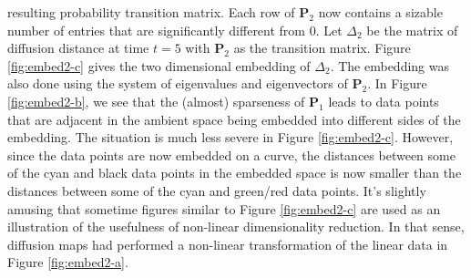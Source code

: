 resulting probability transition matrix. Each row of $\mathbf{P}_2$
now contains a sizable number of entries that are significantly
different from $0$. Let $\Delta_{2}$ be the matrix of diffusion
distance at time $t = 5$ with $\mathbf{P}_2$ as the transition
matrix. Figure \ref{fig:embed2-c} gives the two dimensional embedding
of $\Delta_{2}$. The embedding was also done using the system of
eigenvalues and eigenvectors of $\mathbf{P}_2$. In Figure
\ref{fig:embed2-b}, we see that the (almost) sparseness of
$\mathbf{P}_1$ leads to data points that are adjacent in the ambient
space being embedded into different sides of the embedding. The
situation is much less severe in Figure \ref{fig:embed2-c}. However,
since the data points are now embedded on a curve, the distances
between some of the cyan and black data points in the embedded space
is now smaller than the distances between some of the cyan and green/red
data points. It's slightly amusing that sometime figures similar to
Figure \ref{fig:embed2-c} are used as an illustration of the
usefulness of non-linear dimensionality reduction. In that sense,
diffusion maps had performed a non-linear transformation
of the linear data in Figure \ref{fig:embed2-a}.



